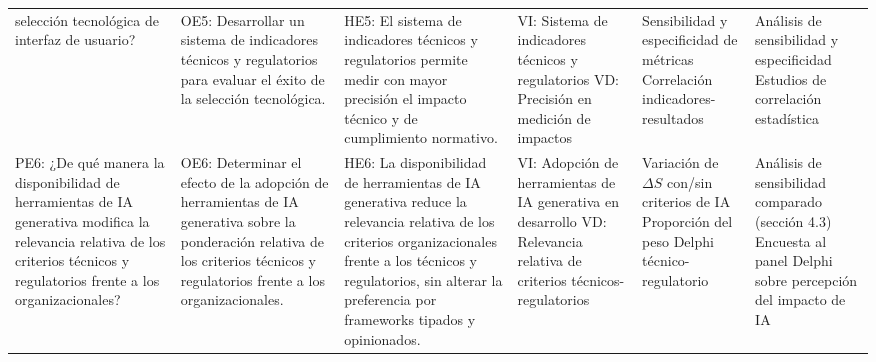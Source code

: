 \begin{landscape}
\begin{spacing}{1}
\begin{longtable}{@{}p{4.1cm}p{4.1cm}p{4.1cm}p{4.1cm}p{4.1cm}p{4.1cm}@{}}
selección tecnológica de interfaz de usuario?
&
OE5: Desarrollar un sistema de indicadores técnicos y regulatorios para
evaluar el éxito de la selección tecnológica.
&
HE5: El sistema de indicadores técnicos y regulatorios permite medir con
mayor precisión el impacto técnico y de cumplimiento normativo.
&
VI: Sistema de indicadores técnicos y regulatorios \newline
VD: Precisión en medición de impactos
&
Sensibilidad y especificidad de métricas \newline
Correlación indicadores-resultados
&
Análisis de sensibilidad y especificidad \newline
Estudios de correlación estadística \\
\addlinespace
PE6: ¿De qué manera la disponibilidad de herramientas de IA generativa
modifica la relevancia relativa de los criterios técnicos y regulatorios frente
a los organizacionales?
&
OE6: Determinar el efecto de la adopción de herramientas de IA generativa
sobre la ponderación relativa de los criterios técnicos y regulatorios
frente a los organizacionales.
&
HE6: La disponibilidad de herramientas de IA generativa reduce la
relevancia relativa de los criterios organizacionales frente a los técnicos y
regulatorios, sin alterar la preferencia por frameworks tipados y
opinionados.
&
VI: Adopción de herramientas de IA generativa en desarrollo \newline
VD: Relevancia relativa de criterios técnicos-regulatorios
&
Variación de $\Delta S$ con/sin criterios de IA \newline
Proporción del peso Delphi técnico-regulatorio
&
Análisis de sensibilidad comparado (sección 4.3) \newline
Encuesta al panel Delphi sobre percepción del impacto de IA \\
\end{longtable}
\setlength{\tabcolsep}{6pt}
\normalsize
\end{spacing}
\makeatother
\end{landscape}
\ClearShipoutPictureFG
\pagestyle{fancy}
\restoregeometry

